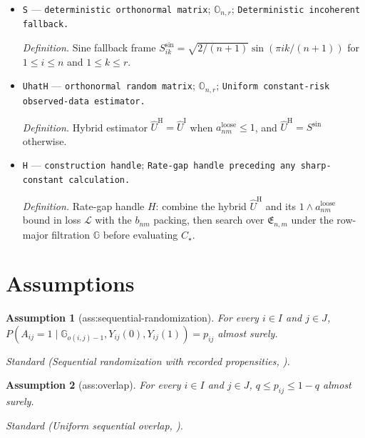 \documentclass{article}
\newtheorem{assumption}{Assumption}
\begin{document}
\begin{itemize}
  \par\smallskip\noindent\emph{Definition.} Loose spectral radius \(a^{\mathrm{loose}}_{nm}=\sqrt{n/(\mu r)}[1\wedge(B/\lambda_{nm})\{\sqrt{(n\vee m)\log(e(n+m))/q}+\log(e(n+m))/q\}]\).
  \item \texttt{S} --- \texttt{deterministic orthonormal matrix}; \(\mathbb O_{n,r}\); \texttt{Deterministic incoherent fallback.}
  \par\smallskip\noindent\emph{Definition.} Sine fallback frame \(S^{\mathrm{sin}}_{ik}=\sqrt{2/(n+1)}\sin(\pi ik/(n+1))\) for \(1\le i\le n\) and \(1\le k\le r\).
  \item \texttt{UhatH} --- \texttt{orthonormal random matrix}; \(\mathbb O_{n,r}\); \texttt{Uniform constant-\allowbreak{}risk observed-\allowbreak{}data estimator.}
  \par\smallskip\noindent\emph{Definition.} Hybrid estimator \(\widehat U^{\mathrm H}=\widehat U^{\mathrm I}\) when \(a^{\mathrm{loose}}_{nm}\le1\), and \(\widehat U^{\mathrm H}=S^{\mathrm{sin}}\) otherwise.
  \item \texttt{H} --- \texttt{construction handle}; \texttt{Rate-\allowbreak{}gap handle preceding any sharp-\allowbreak{}constant calculation.}
  \par\smallskip\noindent\emph{Definition.} Rate-gap handle \(H\): combine the hybrid \(\widehat U^{\mathrm H}\) and its \(1\wedge a^{\mathrm{loose}}_{nm}\) bound in loss \(\mathcal L\) with the \(b_{nm}\) packing, then search over \(\mathfrak E_{n,m}\) under the row-major filtration \(\mathbb G\) before evaluating \(C_\star\).
\end{itemize}

\section{Assumptions}

\begin{assumption}[ass:sequential-randomization]\label{ass:sequential-randomization}
For every \(i\in I\) and \(j\in J\), \(P(A_{ij}=1\mid\mathbb G_{o(i,j)-1},Y_{ij}(0),Y_{ij}(1))=p_{ij}\) almost surely.
\par\smallskip\noindent\emph{Standard} (Sequential randomization with recorded propensities, \cite{HadadHirshbergZhanWagerAthey2021}).
\end{assumption}

\begin{assumption}[ass:overlap]\label{ass:overlap}
For every \(i\in I\) and \(j\in J\), \(q\le p_{ij}\le1-q\) almost surely.
\par\smallskip\noindent\emph{Standard} (Uniform sequential overlap, \cite{HadadHirshbergZhanWagerAthey2021}).
\end{assumption}
\end{document}
